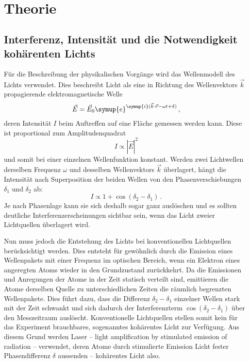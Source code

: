 \section{Theorie}
\label{sec:Theorie}

\subsection{Interferenz, Intensität und die Notwendigkeit kohärenten Lichts}

Für die Beschreibung der physikalischen Vorgänge wird das Wellenmodell des Lichts verwendet. 
Dies beschreibt Licht als eine in Richtung des Wellenvektors $\vec{k}$ propagierende elektromagnetische Welle
\begin{equation*}
    \vec{E}=\vec{E}_0 \symup{e}^{\symup{i}(\vec{k}\cdot \vec{r}-\omega t +\delta)}\,,
\end{equation*} 
deren Intensität $I$ beim Auftreffen auf eine Fläche gemessen werden kann. 
Diese ist proportional zum Amplitudenquadrat
\begin{equation*}
    I \propto |\vec{E}|^2
\end{equation*}
und somit bei einer einzelnen Wellenfunktion konstant. 
Werden zwei Lichtwellen derselben Frequenz $\omega$ und desselben Wellenvektors $\vec{k}$ überlagert, hängt die Intensität nach Superposition der beiden Wellen 
von den Phasenverschiebungen $\delta_1$ und $\delta_2$ ab\cite{Versuchsanleitung}: 
\begin{equation*}
    I \propto 1+\cos (\delta_2-\delta_1)\,.
\end{equation*}
Je nach Phasenlage kann sie sich deshalb sogar ganz auslöschen und es sollten deutliche Interferenzerscheinungen sichtbar sein, wenn 
das Licht zweier Lichtquellen überlagert wird. 

Nun muss jedoch die Entstehung des Lichts bei konventionellen Lichtquellen berücksichtigt werden. 
Dies entsteht für gewöhnlich durch die Emission eines Wellenpakets mit einer Frequenz im optischen Bereich, wenn ein Elektron 
eines angeregten Atoms wieder in den Grundzustand zurückkehrt. 
Da die Emissionen und Anregungen der Atome in der Zeit statisch verteilt sind, emittieren die Atome derselben Quelle zu unterschiedlichen Zeiten die 
räumlich begrenzten Wellenpakete.
Dies führt dazu, dass die Differenz $\delta_2-\delta_1$ einzelner Wellen stark mit der Zeit schwankt und sich dadurch der Interferenzterm $\cos (\delta_2-\delta_1)$ 
über den Messzeitraum auslöscht\cite{Versuchsanleitung}. 
Konventionelle Lichtquellen stellen somit kein für das Experiment brauchbares, sogenanntes kohärentes Licht zur Verfügung. 
Aus diesem Grund werden Laser -- light amplification by stimulated emission of radiation -- verwendet, deren Atome durch 
stimulierte Emission Licht fester Phasendifferenz $\delta$ aussenden -- kohärentes Licht also. 

